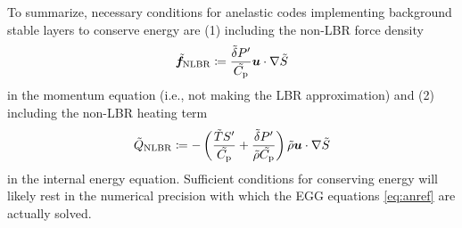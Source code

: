 \documentclass[12pt]{article}
\begin{document}
To summarize, necessary conditions for anelastic codes implementing background stable layers to conserve energy are (1) including the non-LBR force density 
\begin{align}\label{eq:nlbrmomref}
	\tilde{\bm{f}}_{\rm NLBR} \coloneqq\frac{\tilde{\delta} P^\prime}{\tilde{C_{\rm{p}}}} \bm{u}\cdot \nabla\tilde{S} 
\end{align}
in the momentum equation (i.e., not making the LBR approximation) and (2) including the non-LBR heating term
\begin{align}\label{eq:nlbrheatref}
	\tilde{Q}_{\rm NLBR} \coloneqq -  \left(\frac{\tilde{T} S^\prime}{\tilde{C_{\rm{p}}}} + \frac{\tilde{\delta} P^\prime}{\tilde{\rho}\tilde{C_{\rm{p}}}}\right)  \tilde{\rho} \bm{u}\cdot\nabla\tilde{S}
\end{align}
in the internal energy equation. Sufficient conditions for conserving energy will likely rest in the numerical precision with which the EGG equations \eqref{eq:anref} are actually solved. 
	\newpage
		
\end{document}
